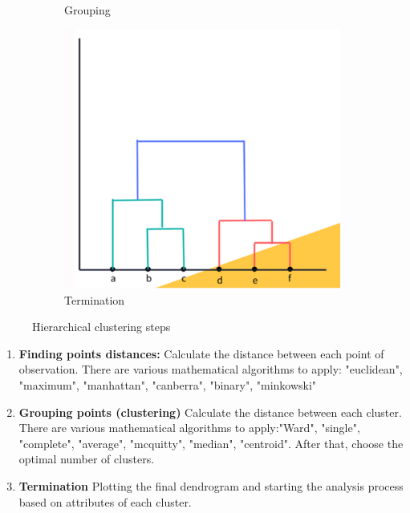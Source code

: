 \begin{figure}[H]
\begin{subfigure}[b]{0.3\textwidth}
         \caption{Grouping}
     \end{subfigure}
     \hfill
     \begin{subfigure}[b]{0.3\textwidth}
         \centering
         \includegraphics[width=\textwidth]{graphics/overview/Termination.png}
         \caption{Termination}
     \end{subfigure}
        \caption{Hierarchical clustering steps}
\end{figure}

\begin{enumerate}
    \item \textbf{Finding points distances:} Calculate the distance between each point of observation. There are various mathematical algorithms to apply: "euclidean", "maximum", "manhattan", "canberra", "binary", "minkowski"

    \item \textbf{Grouping points (clustering)} Calculate the distance between each cluster. There are various mathematical algorithms to apply:"Ward", "single", "complete", "average", "mcquitty", "median", "centroid". After that, choose the optimal number of clusters. 

    \item \textbf{Termination} Plotting the final dendrogram and starting the analysis process based on attributes of each cluster.
\end{enumerate}

